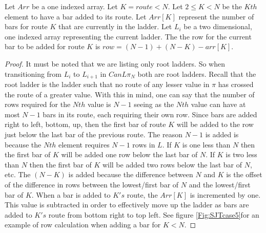 \begin{lemma}
  Let $Arr$ be a one indexed array. Let $K=route < N$. Let $2 \leq K < N$ be the $Kth$ element to have a bar added to its route. 
  Let $Arr[K]$ represent the number of bars for route $K$ that are currently in the 
  ladder. Let $L_{i}$ be a two dimensional, one indexed array representing the current ladder.
  The the row for the current bar to be added for route $K$ is $row=(N-1) + (N-K) - arr[K]$.
\end{lemma}
\begin{proof}
   It must be noted that we are listing only root ladders. So when transitioning from 
$L_{i}$ to $L_{i+1}$ in $CanL{\pi_{N}}$ both are root ladders. Recall that the root ladder is the ladder such that no  
route of any lesser value in $\pi$ has crossed the route of a greater value. With this in mind, one can say that the 
number of rows required for the $Nth$ value is $N-1$ seeing as the $Nth$ value can have at most $N-1$ bars in its route, each requiring  their own 
row. Since bars are added right to left, bottom, up, then the first bar of route $K$ will be added to the row 
just  below the last bar of the previous route. The reason $N-1$ is added is because the $Nth$ element requires 
$N-1$ rows in $L$. If $K$ is one less than $N$ then 
the first bar of $K$ will be added one row below the last bar of $N$. If $K$ is two less than $N$ then the first bar 
of $K$ will be added two rows below the last bar of $N$, etc. The $(N-K)$ is added because 
the difference between $N$ and $K$ is the offset of the difference in rows between the lowest/first bar of $N$ 
and the lowest/first bar of $K$. When a bar is added to $K's$ route, the $Arr[K]$ is incremented by one. This value is subtracted in 
order to effectively move up the ladder as bars are added to $K's$ route from bottom right to top left. See figure \ref{Fig:SJTcase5}for an example of 
row calculation when adding a bar for $K < N$.
\end{proof}\pagebreak

